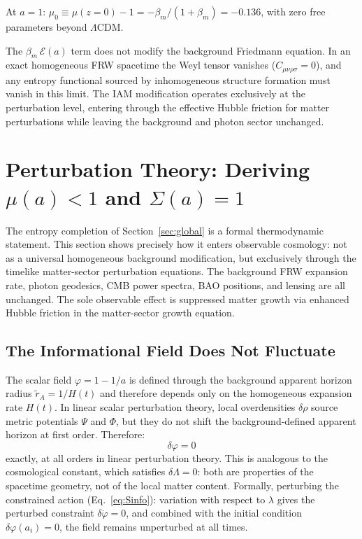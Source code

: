 \documentclass[12pt,a4paper]{article}
\begin{document}
At $a = 1$: $\mu_0 \equiv \mu(z{=}0) - 1 = -\beta_m/(1+\beta_m)
= -0.136$, with zero free parameters beyond $\Lambda$CDM.

The $\beta_m\,\mathcal{E}(a)$ term does not modify the background
Friedmann equation. In an exact homogeneous FRW spacetime the Weyl
tensor vanishes ($C_{\mu\nu\rho\sigma} = 0$), and any entropy
functional sourced by inhomogeneous structure formation must vanish
in this limit. The IAM modification operates exclusively at the
perturbation level, entering through the effective Hubble friction
for matter perturbations while leaving the background and photon
sector unchanged.

\section{Perturbation Theory: Deriving $\mu(a) < 1$ and $\Sigma(a) = 1$}
\label{sec:perturbations}

The entropy completion of Section~\ref{sec:global} is a formal
thermodynamic statement. This section shows precisely how it enters
observable cosmology: not as a universal homogeneous background
modification, but exclusively through the timelike matter-sector
perturbation equations. The background FRW expansion rate, photon
geodesics, CMB power spectra, BAO positions, and lensing are all
unchanged. The sole observable effect is suppressed matter growth via
enhanced Hubble friction in the matter-sector growth equation.

\subsection{The Informational Field Does Not Fluctuate}

The scalar field $\varphi = 1 - 1/a$ is defined through the background
apparent horizon radius $\tilde{r}_A = 1/H(t)$ and therefore depends
only on the homogeneous expansion rate $H(t)$. In linear scalar
perturbation theory, local overdensities $\delta\rho$ source metric
potentials $\Psi$ and $\Phi$, but they do not shift the
background-defined apparent horizon at first order. Therefore:
\begin{equation}
\delta\varphi = 0
\label{eq:dphi_zero}
\end{equation}
exactly, at all orders in linear perturbation theory. This is
analogous to the cosmological constant, which satisfies
$\delta\Lambda = 0$: both are properties of the spacetime geometry,
not of the local matter content. Formally, perturbing the constrained
action (Eq.~\eqref{eq:Sinfo}): variation with respect to $\lambda$
gives the perturbed constraint $\delta\dot{\varphi} = 0$, and combined
with the initial condition $\delta\varphi(a_i) = 0$, the field remains
unperturbed at all times.
\end{document}
